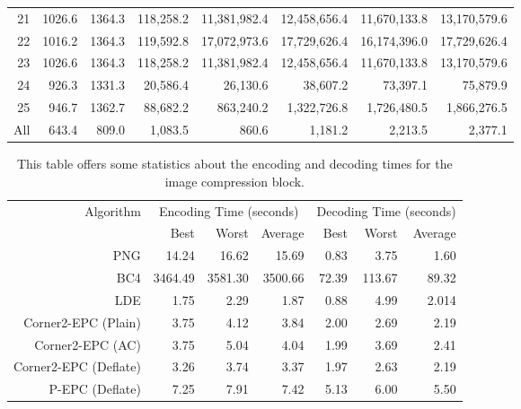 \documentclass{article}
\begin{document}
\begin{table}
\begin{center}
\begin{tabular}{r r r r r r r r}
\tabularnewline
21 & 1026.6 & 1364.3 & 118,258.2 & 11,381,982.4 & 12,458,656.4 & 11,670,133.8 & 13,170,579.6
\tabularnewline
22 & 1016.2 & 1364.3 & 119,592.8 & 17,072,973.6 &  17,729,626.4 & 16,174,396.0 & 17,729,626.4
\tabularnewline
23 & 1026.6 & 1364.3 & 118,258.2 & 11,381,982.4 & 12,458,656.4 & 11,670,133.8 & 13,170,579.6
\tabularnewline
24 & 926.3 & 1331.3 & 20,586.4 & 26,130.6 & 38,607.2 & 73,397.1 & 75,879.9
\tabularnewline
25 & 946.7 & 1362.7 & 88,682.2 & 863,240.2 & 1,322,726.8 & 1,726,480.5 & 1,866,276.5
\tabularnewline
All & 643.4 & 809.0 & 1,083.5 & 860.6 & 1,181.2 & 2,213.5 & 2,377.1
\tabularnewline
\hline \hline
\end{tabular}
\par\end{center}
\end{table}

\bigskip

\begin{table}
\caption{This table offers some statistics about the encoding and decoding 
times for the image compression block.}
\begin{center}
\begin{tabular}{ r r r r r r r }
\hline \hline
\multirow{2}{*}{Algorithm}
&\multicolumn{3}{c}{Encoding Time (seconds)}
&\multicolumn{3}{c}{Decoding Time (seconds)}\\
\cline{2-7}
 & Best & Worst & Average & Best & Worst & Average 
\tabularnewline
\hline
PNG & 14.24 & 16.62 & 15.69 & 0.83 & 3.75 & 1.60 
\tabularnewline
BC4 & 3464.49 & 3581.30 & 3500.66 & 72.39 & 113.67 & 89.32 
\tabularnewline
LDE & 1.75 & 2.29 & 1.87 & 0.88 & 4.99 & 2.014 
\tabularnewline
Corner2-EPC (Plain) & 3.75 & 4.12 & 3.84 & 2.00 & 2.69 & 2.19 
\tabularnewline
Corner2-EPC (AC) & 3.75 & 5.04 & 4.04 & 1.99 & 3.69 & 2.41 
\tabularnewline
Corner2-EPC (Deflate) & 3.26 & 3.74 & 3.37 & 1.97 & 2.63 & 2.19 
\tabularnewline
P-EPC (Deflate) & 7.25 & 7.91 & 7.42 & 5.13 & 6.00 & 5.50 
\tabularnewline
\hline \hline
\end{tabular}
\end{center}
\end{table}

\bigskip
\end{document}
